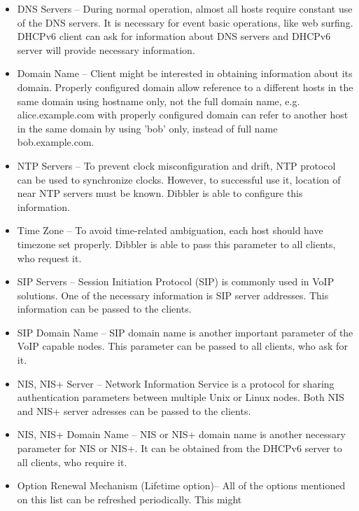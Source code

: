 \begin{itemize}
\item DNS Servers -- During normal operation, almost all hosts require
      constant use of the DNS servers. It is necessary for event basic
      operations, like web surfing. DHCPv6 client can ask for
      information about DNS servers and DHCPv6 server will provide
      necessary information. \cite{rfc3646}
\item Domain Name -- Client might be interested in obtaining information
      about its domain. Properly configured domain allow reference to a
      different hosts in the same domain using hostname only, not the
      full domain name, e.g. alice.example.com with properly configured
      domain can refer to another host in the same domain by using 'bob'
      only, instead of full name bob.example.com. \cite{rfc3646}
\item NTP Servers -- To prevent clock misconfiguration and drift, NTP
      protocol \cite{rfc2030} can be used to synchronize clocks. However, to
      successful use it, location of near NTP servers must be
      known. Dibbler is able to configure this information. \cite{rfc4075}
\item Time Zone -- To avoid time-related ambiguation, each host should
      have timezone set properly. Dibbler is able to pass this parameter
      to all clients, who request it. \cite{draft-timezone}
\item SIP Servers -- Session Initiation Protocol (SIP) \cite{rfc3263} is
      commonly used in VoIP solutions. One of the necessary information
      is SIP server addresses. This information can be passed to
      the clients. \cite{rfc3319}
\item SIP Domain Name -- SIP domain name is another important parameter
      of the VoIP capable nodes. This parameter can be passed to all
      clients, who ask for it. \cite{rfc3319}
\item NIS, NIS+ Server -- Network Information Service is a protocol for
      sharing authentication parameters between multiple Unix or Linux
      nodes. Both NIS and NIS+ server adresses can be passed to the
      clients. \cite{rfc3898}
\item NIS, NIS+ Domain Name -- NIS or NIS+ domain name is another necessary
      parameter for NIS or NIS+. It can be obtained from the DHCPv6
      server to all clients, who require it. \cite{rfc3898}
\item Option Renewal Mechanism (Lifetime option)-- All of the options
      mentioned on this list can be refreshed periodically. This might

\end{itemize}
